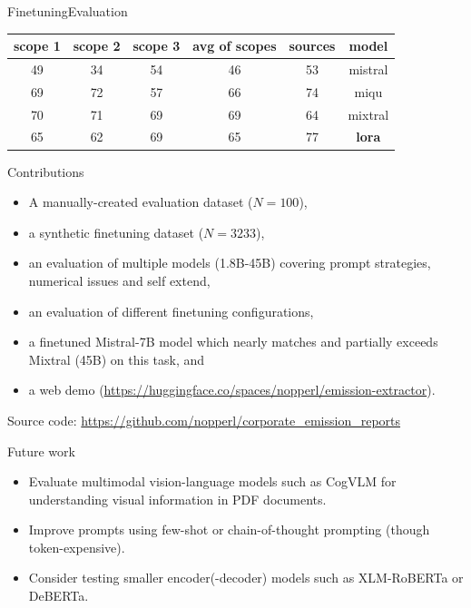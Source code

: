 \documentclass{beamer}
\begin{document}
\begin{frame}{Finetuning}{Evaluation}
\begin{table}[h]
	\centering
	\begin{tabular}{|c|c|c|c|c|c|}
		\hline
		\textbf{scope 1} & \textbf{scope 2} & \textbf{scope 3} & \textbf{avg of scopes} & \textbf{sources} & \textbf{model} \\
		\hline
		49 & 34 & 54 & 46 & 53 & mistral \\
		69 & 72 & 57 & 66 & 74 & miqu \\
		70 & 71 & 69 & 69 & 64 & mixtral \\
		65 & 62 & 69 & 65 & 77 & \textbf{lora} \\
		\hline
	\end{tabular}
\end{table}
\end{frame}

\begin{frame}{Contributions}
	\begin{itemize}
		\item A manually-created evaluation dataset ($N=100$),
		\item a synthetic finetuning dataset ($N=3233$),
		\item an evaluation of multiple models (1.8B-45B) covering prompt strategies, numerical issues and self extend,
		\item an evaluation of different finetuning configurations,
		\item a finetuned Mistral-7B model which nearly matches and partially exceeds Mixtral (45B) on this task, and
		\item a web demo (\url{https://huggingface.co/spaces/nopperl/emission-extractor}).
	\end{itemize}
	Source code: \url{https://github.com/nopperl/corporate_emission_reports}
\end{frame}

\begin{frame}{Future work}
\begin{itemize}
	\item Evaluate multimodal vision-language models such as CogVLM for understanding visual information in PDF documents.
	\item Improve prompts using few-shot or chain-of-thought prompting (though token-expensive).
	\item Consider testing smaller encoder(-decoder) models such as XLM-RoBERTa or DeBERTa.
\end{itemize}
\end{frame}
\end{document}
